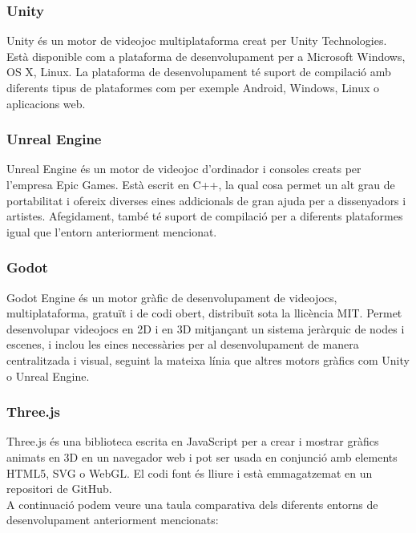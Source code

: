 ﻿\documentclass[10pt,a4paper,twocolumn,twoside]{article}
\begin{document}
\subsubsection{Unity}
Unity és un motor de videojoc multiplataforma creat per Unity Technologies. Està disponible com a plataforma de desenvolupament per a Microsoft Windows, OS X, Linux. La plataforma de desenvolupament té suport de compilació amb diferents tipus de plataformes com per exemple Android, Windows, Linux o aplicacions web.
\subsubsection{Unreal Engine}
Unreal Engine és un motor de videojoc d'ordinador i consoles creats per l'empresa Epic Games. Està escrit en C++, la qual cosa permet un alt grau de portabilitat i ofereix diverses eines addicionals de gran ajuda per a dissenyadors i artistes. Afegidament, també té suport de compilació per a diferents plataformes igual que l'entorn anteriorment mencionat.
\subsubsection{Godot}
Godot Engine és un motor gràfic de desenvolupament de videojocs, multiplataforma, gratuït i de codi obert, distribuït sota la llicència MIT. Permet desenvolupar videojocs en 2D i en 3D mitjançant un sistema jeràrquic de nodes i escenes, i inclou les eines necessàries per al desenvolupament de manera centralitzada i visual, seguint la mateixa línia que altres motors gràfics com Unity o Unreal Engine.
\subsubsection{Three.js}
Three.js és una biblioteca escrita en JavaScript per a crear i mostrar gràfics animats en 3D en un navegador web i pot ser usada en conjunció amb elements HTML5, SVG o WebGL. El codi font és lliure i està emmagatzemat en un repositori de GitHub.\\

A continuació podem veure una taula comparativa dels diferents entorns de desenvolupament anteriorment mencionats:
\end{document}
